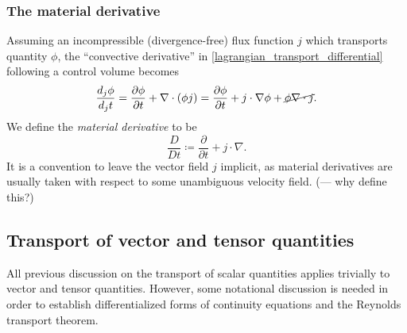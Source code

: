 \documentclass[11pt,a4paper]{memoir}
\newcommand{\Part}[2]{\frac{\partial #1}{\partial #2}}
\begin{document}
\subsubsection{The material derivative}
Assuming an incompressible (divergence-free) flux function $j$ which transports quantity $\phi$, the ``convective derivative'' in
\eqref{lagrangian_transport_differential} following a control volume becomes
\begin{equation}\label{lagrangian_transport_differential}
    \frac{d_j\phi}{d_j t} = \Part{\phi}{t} + \nabla\cdot(\phi j) = \Part{\phi}{t} + j\cdot\nabla\phi + \cancel{\phi \nabla\cdot j}.
\end{equation}
We define the \textit{material derivative} to be
\begin{equation}\label{material_derivative}
    \frac{D}{Dt} \coloneqq \Part{}{t} + j\cdot\nabla.
\end{equation}
It is a convention to leave the vector field $j$ implicit, as material derivatives are usually taken with respect to some unambiguous velocity field.
(--- why define this?)

\subsection{Transport of vector and tensor quantities}
All previous discussion on the transport of scalar quantities applies trivially to vector and tensor quantities.
However, some notational discussion is needed in order to establish differentialized forms of continuity equations and the Reynolds transport theorem.
\end{document}
